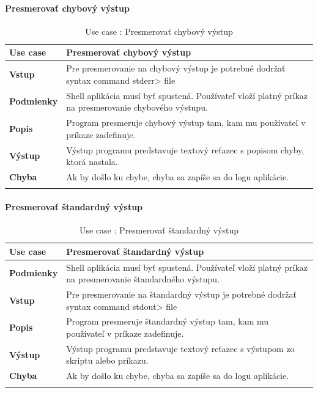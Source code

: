 \paragraph{Presmerovať chybový výstup}
\begin{center}
	\begin{longtable}{|p{2.5cm}|p{12.2cm}|}
		
			\hline
			\textbf{Use case} & Presmerovať chybový výstup \\ 
			\hline
			\textbf{Vstup} & Pre presmerovanie na chybový výstup je potrebné dodržať syntax command stderr> file\\
			\hline
			\textbf{Podmienky} & Shell aplikácia musí byť spustená. Používateľ vloží platný príkaz na presmerovanie chybového výstupu. \\ 
			\hline
			\textbf{Popis} & Program presmeruje chybový výstup tam, kam mu používateľ v príkaze zadefinuje. \\ 
			\hline
			\textbf{Výstup} & Výstup programu predstavuje textový reťazec s popisom chyby, ktorá nastala.\\
			\hline
			\textbf{Chyba} & Ak by došlo ku chybe, chyba sa zapíše sa do logu aplikácie.\\
			\hline
		\caption{Use case : Presmerovať chybový výstup}
		\label{table:1}
		
	\end{longtable}
\end{center}
\paragraph{Presmerovať štandardný výstup}
\begin{center}
	\begin{longtable}{|p{2.5cm}|p{12.2cm}|}
		
			\hline
			\textbf{Use case} & Presmerovať štandardný výstup \\ 
			\hline
			\textbf{Podmienky} & Shell aplikácia musí byť spustená. Používateľ vloží platný príkaz na presmerovanie štandardného výstupu. \\ 
			\hline
			\textbf{Vstup} & Pre presmerovanie na štandardný výstup je potrebné dodržať syntax command stdout> file\\
			\hline
			\textbf{Popis} & Program presmeruje štandardný výstup tam, kam mu používateľ v príkaze zadefinuje.\\ 
			\hline
			\textbf{Výstup} & Výstup programu predstavuje textový reťazec s výstupom zo skriptu alebo príkazu.\\
			\hline
			\textbf{Chyba} & Ak by došlo ku chybe, chyba sa zapíše sa do logu aplikácie.\\
			\hline
		\caption{Use case : Presmerovať štandardný výstup }
		\label{table:1}
		
	\end{longtable}
\end{center}



